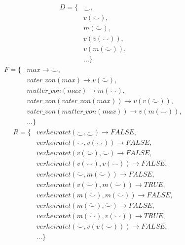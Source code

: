 \documentclass[11pt,a4paper]{article}
\begin{document}
\begin{equation*}
\begin{split}
D = \{ & \ddot\smile, \\
       & v(\ddot\smile), \\
       & m(\ddot\smile), \\
       & v(v(\ddot\smile)), \\
       & v(m(\ddot\smile)), \\
       & ... \}
\end{split}
\end{equation*}
\begin{equation*}
\begin{split}
F  = \{ & max \rightarrow \ddot\smile,\\
        & vater\_von(max) \rightarrow v(\ddot\smile),\\
        & mutter\_von(max)\rightarrow  m(\ddot\smile),\\
        & vater\_von(vater\_von(max))\rightarrow v(v(\ddot\smile)), \\
        & vater\_von(mutter\_von(max)) \rightarrow v(m(\ddot\smile)), \\
        & ... \}
\end{split}
\end{equation*}
\begin{equation*}
\begin{split}
R  = \{ & verheiratet(\ddot\smile,\ddot\smile) \rightarrow FALSE,\\
        & verheiratet(\ddot\smile,v(\ddot\smile)) \rightarrow FALSE,\\
        & verheiratet(v(\ddot\smile),\ddot\smile) \rightarrow FALSE,\\
        & verheiratet(v(\ddot\smile),v(\ddot\smile)) \rightarrow FALSE,\\
        & verheiratet(\ddot\smile,m(\ddot\smile)) \rightarrow FALSE,\\
        & verheiratet(v(\ddot\smile),m(\ddot\smile)) \rightarrow TRUE,\\
        & verheiratet(m(\ddot\smile),m(\ddot\smile)) \rightarrow FALSE,\\
        & verheiratet(m(\ddot\smile),\ddot\smile) \rightarrow FALSE,\\
        & verheiratet(m(\ddot\smile),v(\ddot\smile)) \rightarrow TRUE,\\
        & verheiratet(\ddot\smile,v(v(\ddot\smile))) \rightarrow FALSE,\\
        & ... \}
\end{split}
\end{equation*}
\end{document}
